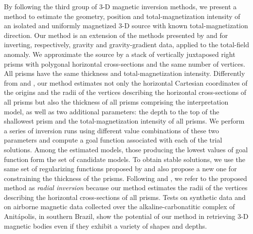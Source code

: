 By following the third group of 3-D magnetic inversion methods, 
we present a method to estimate the geometry, position and total-magnetization
intensity of an isolated and uniformly magnetized 3-D source with known
total-magnetization direction.
Our method is an extension of the methods presented 
by \cite{oliveirajr-etal2011} and \cite{oliveirajr-barbosa2013} for inverting, respectively, 
gravity and gravity-gradient data, applied to the total-field anomaly. 
We approximate the source by a stack of vertically juxtaposed 
right prisms with polygonal horizontal cross-sections and the same number of vertices.
All prisms have the same thickness and total-magnetization intensity.
Differently from \cite{oliveirajr-etal2011} and \cite{oliveirajr-barbosa2013}, 
our method estimates not only the horizontal Cartesian coordinates of the origins and the radii of the vertices describing the horizontal cross-sections of all prisms but also the thickness of all prisms comprising the interpretation model, as well as
two additional parameters: the depth to the top of the shallowest prism and the
total-magnetization intensity of all prisms. 
We perform a series of inversion runs using different value combinations of these two parameters and compute a goal function associated with each of the trial solutions.
Among the estimated models, those producing the 
lowest values of goal function form the set of candidate models.
To obtain stable solutions, we use the same set of regularizing functions proposed by 
\cite{oliveirajr-etal2011} and also propose a new one for constraining the 
thickness of the prisms. 
Following \cite{oliveirajr-etal2011} and \cite{oliveirajr-barbosa2013}, we refer to the proposed method as \textit{radial inversion} because our method estimates the radii of the vertices describing the horizontal cross-sections of all prisms.
Tests on synthetic data and on airborne magnetic data collected over the alkaline-carbonatitic complex of Anit{\'a}polis, in southern Brazil, show the potential of our method in retrieving 3-D magnetic bodies even if they exhibit a variety of shapes and depths. 


